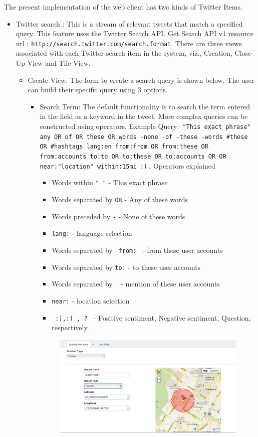 The present implementation of the web client has two kinds of Twitter Items. 
\begin{itemize}
	\item Twitter search : This is a stream of relevant tweets that match a specified query. This feature uses the Twitter Search API. Get Search API v1 resource url : \texttt{http://search.twitter.com/search.format}. There are three views associated with each Twitter search item in the system, viz., Creation, Close-Up View  and Tile View.
	\begin{itemize}
		\item Create View: The form to create a search query is shown below. The user can build their specific query using 3 options.
		\begin{itemize}
		\item Search Term: The default functionality is to search the term entered in the field as a keyword in the tweet. More complex queries can be constructed using operators. Example Query:\texttt{ "This exact phrase" any OR of OR these OR words -none -of -these -words \#these OR \#hashtags lang:en from:from OR from:these OR from:accounts to:to OR to:these OR to:accounts \@mentioning OR \@these OR \@accounts near:"location" within:15mi :(.} Operators explained
		\begin{itemize}
		\item Words within \texttt{" "} -   This exact phrase
		\item Words separated by \texttt{OR} - Any of these words
		\item Words preceded by \texttt{-} - None of these words
		\item \texttt{lang:} - language selection
		\item Words separated by \texttt{ from: } - from these user accounts 
		\item Words separated by \texttt{to:} - to these user accounts 
		\item Words separated by \texttt{ \@} - mention of these user accounts 
		\item \texttt{near:} - location selection 
		\item \texttt{ :),:( , ? } - Positive sentiment, Negative sentiment, Question, respectively.		
		\end{itemize}
\begin{figure}
\begin{center}
\includegraphics[scale=0.3]{createtwitter.png}

\end{center}
\end{figure}
\end{itemize}
\end{itemize}
\end{itemize}
